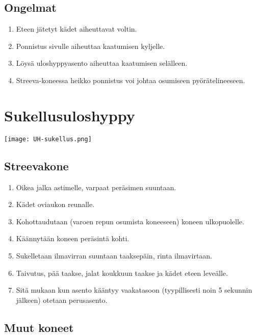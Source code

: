 \subsection{ Ongelmat }
\label{uloshyppytyylit-ongelmat}

\begin{enumerate}[label=\bfseries \arabic*)]
\item  Eteen jätetyt kädet aiheuttavat voltin. 
\item  Ponnistus sivulle aiheuttaa kaatumisen kyljelle. 
\item  Löysä uloshyppyasento aiheuttaa kaatumisen selälleen. 
\item  Streeva-koneessa heikko ponnistus voi johtaa osumiseen pyörätelineeseen. 
\end{enumerate}
\section{ Sukellusuloshyppy }
\label{uloshyppytyylit-sukellusuloshyppy}


\begin{Figure}\centering\texttt{[image: UH-sukellus.png]}\end{Figure} 

\subsection{ Streevakone }
\label{uloshyppytyylit-streevakone}

\begin{enumerate}[label=\bfseries \arabic*)]
\item  Oikea jalka astimelle, varpaat peräsimen suuntaan. 
\item  Kädet oviaukon reunalle. 
\item  Kohottaudutaan (varoen repun osumista koneeseen) koneen ulkopuolelle. 
\item  Käännytään koneen peräsintä kohti. 
\item  Sukelletaan ilmavirran suuntaan taaksepäin, rinta ilmavirtaan. 
\item  Taivutus, pää taakse, jalat koukkuun taakse ja kädet eteen leveälle. 
\item  Sitä mukaan kun asento kääntyy vaakatasoon (tyypillisesti noin 5 sekunnin jälkeen) otetaan perusasento. 
\end{enumerate}
\subsection{ Muut koneet }
\label{uloshyppytyylit-muut-koneet}

